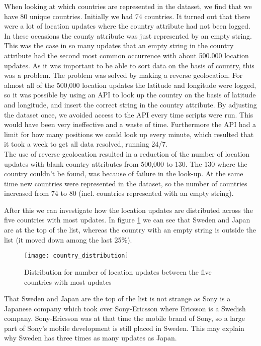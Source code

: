 When looking at which countries are represented in the dataset, we find that we have 80 unique countries. Initially we had 74 countries. It turned out that there were a lot of location updates where the country attribute had not been logged. In these occasions the county attribute was just represented by an empty string. This was the case in so many updates that an empty string in the country attribute had the second most common occurrence with about 500.000 location updates. 
As it was important to be able to sort data on the basis of country, this was a problem. The problem was solved by making a reverse geolocation. For almost all of the 500,000 location updates the latitude and longitude were logged, so it was possible by using an API\cite{reversegeocode} to look up the country on the basis of latitude and longitude, and insert the correct string in the country attribute. By adjusting the dataset once, we avoided access to the API every time scripts were run. This would have been very ineffective and a waste of time. Furthermore the API had a limit for how many positions we could look up every minute, which resulted that it took a week to get all data resolved, running 24/7.  \\ 
The use of reverse geolocation resulted in a reduction of the number of location updates with blank country attributes from 500,000 to 130. The 130 where the country couldn't be found, was because of failure in the look-up. At the same time new countries were represented in the dataset, so the number of countries increased from 74 to 80 (incl. countries represented with an empty string). 


After this we can investigate how the location updates are distributed across the five countries with most updates. In figure \ref{fig:country_dist} we can see that Sweden and Japan are at the top of the list, whereas the country with an empty string is outside the list (it moved down among the last 25\%). 


\begin{figure}[H]
    \hspace*{-1.0cm}
    \centering
    \texttt{[image: country\_distribution]}
    \caption{Distribution for number of location updates between the five countries with most updates}
    \label{fig:country_dist}
\end{figure}


That Sweden and Japan are the top of the list is not strange as Sony is a Japanese company which took over Sony-Ericsson where Ericsson is a Swedish company. Sony-Ericsson was at that time the mobile brand of Sony, so a large part of Sony's mobile development is still placed in Sweden. This may explain why Sweden has three times as many updates as Japan.  


